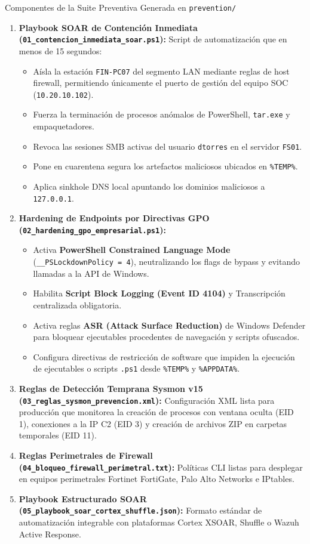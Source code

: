 \documentclass[11pt,a4paper]{article}
\begin{document}
\begin{cajaSolucion}{Componentes de la Suite Preventiva Generada en \texttt{prevention/}}
\begin{enumerate}[leftmargin=*, noitemsep]
    \item \textbf{Playbook SOAR de Contención Inmediata (\texttt{01\_contencion\_inmediata\_soar.ps1}):} Script de automatización que en menos de 15 segundos:
    \begin{itemize}[noitemsep]
        \item Aísla la estación \texttt{FIN-PC07} del segmento LAN mediante reglas de host firewall, permitiendo únicamente el puerto de gestión del equipo SOC (\texttt{10.20.10.102}).
        \item Fuerza la terminación de procesos anómalos de PowerShell, \texttt{tar.exe} y empaquetadores.
        \item Revoca las sesiones SMB activas del usuario \texttt{dtorres} en el servidor \texttt{FS01}.
        \item Pone en cuarentena segura los artefactos maliciosos ubicados en \texttt{\%TEMP\%}.
        \item Aplica sinkhole DNS local apuntando los dominios maliciosos a \texttt{127.0.0.1}.
    \end{itemize}
    \item \textbf{Hardening de Endpoints por Directivas GPO (\texttt{02\_hardening\_gpo\_empresarial.ps1}):}
    \begin{itemize}[noitemsep]
        \item Activa \textbf{PowerShell Constrained Language Mode} (\texttt{\_\_PSLockdownPolicy = 4}), neutralizando los flags de bypass y evitando llamadas a la API de Windows.
        \item Habilita \textbf{Script Block Logging (Event ID 4104)} y Transcripción centralizada obligatoria.
        \item Activa reglas \textbf{ASR (Attack Surface Reduction)} de Windows Defender para bloquear ejecutables procedentes de navegación y scripts ofuscados.
        \item Configura directivas de restricción de software que impiden la ejecución de ejecutables o scripts \texttt{.ps1} desde \texttt{\%TEMP\%} y \texttt{\%APPDATA\%}.
    \end{itemize}
    \item \textbf{Reglas de Detección Temprana Sysmon v15 (\texttt{03\_reglas\_sysmon\_prevencion.xml}):} Configuración XML lista para producción que monitorea la creación de procesos con ventana oculta (EID 1), conexiones a la IP C2 (EID 3) y creación de archivos ZIP en carpetas temporales (EID 11).
    \item \textbf{Reglas Perimetrales de Firewall (\texttt{04\_bloqueo\_firewall\_perimetral.txt}):} Políticas CLI listas para desplegar en equipos perimetrales Fortinet FortiGate, Palo Alto Networks e IPtables.
    \item \textbf{Playbook Estructurado SOAR (\texttt{05\_playbook\_soar\_cortex\_shuffle.json}):} Formato estándar de automatización integrable con plataformas Cortex XSOAR, Shuffle o Wazuh Active Response.
\end{enumerate}
\end{cajaSolucion}
\end{document}
